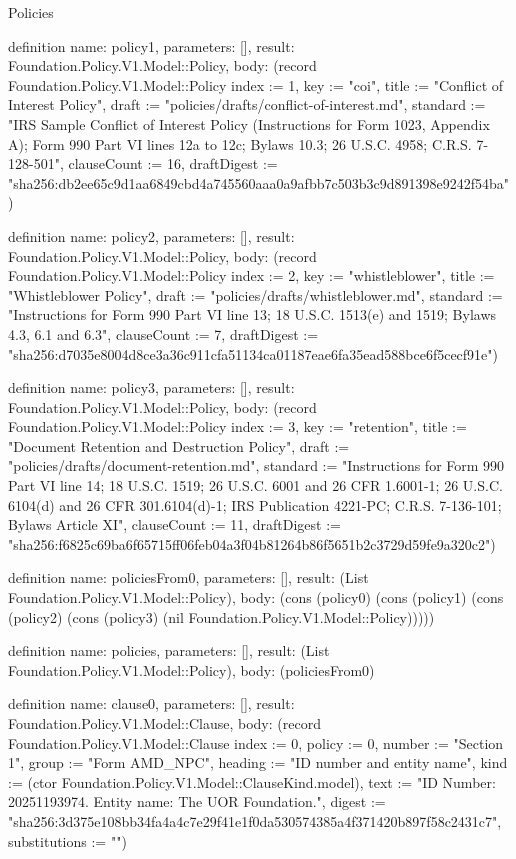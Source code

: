 \begin{lexlean}{Policies}
\begin{semanticmodule}
definition{
  name: policy1,
  parameters: [],
  result: Foundation.Policy.V1.Model::Policy,
  body: (record Foundation.Policy.V1.Model::Policy {index := 1, key := "coi", title := "Conflict of Interest Policy", draft := "policies/drafts/conflict-of-interest.md", standard := "IRS Sample Conflict of Interest Policy (Instructions for Form 1023, Appendix A); Form 990 Part VI lines 12a to 12c; Bylaws 10.3; 26 U.S.C. 4958; C.R.S. 7-128-501", clauseCount := 16, draftDigest := "sha256:db2ee65c9d1aa6849cbd4a745560aaa0a9afbb7c503b3c9d891398e9242f54ba"})
}

definition{
  name: policy2,
  parameters: [],
  result: Foundation.Policy.V1.Model::Policy,
  body: (record Foundation.Policy.V1.Model::Policy {index := 2, key := "whistleblower", title := "Whistleblower Policy", draft := "policies/drafts/whistleblower.md", standard := "Instructions for Form 990 Part VI line 13; 18 U.S.C. 1513(e) and 1519; Bylaws 4.3, 6.1 and 6.3", clauseCount := 7, draftDigest := "sha256:d7035e8004d8ce3a36c911cfa51134ca01187eae6fa35ead588bce6f5cecf91e"})
}

definition{
  name: policy3,
  parameters: [],
  result: Foundation.Policy.V1.Model::Policy,
  body: (record Foundation.Policy.V1.Model::Policy {index := 3, key := "retention", title := "Document Retention and Destruction Policy", draft := "policies/drafts/document-retention.md", standard := "Instructions for Form 990 Part VI line 14; 18 U.S.C. 1519; 26 U.S.C. 6001 and 26 CFR 1.6001-1; 26 U.S.C. 6104(d) and 26 CFR 301.6104(d)-1; IRS Publication 4221-PC; C.R.S. 7-136-101; Bylaws Article XI", clauseCount := 11, draftDigest := "sha256:f6825c69ba6f65715ff06feb04a3f04b81264b86f5651b2c3729d59fe9a320c2"})
}

definition{
  name: policiesFrom0,
  parameters: [],
  result: (List Foundation.Policy.V1.Model::Policy),
  body: (cons (policy0) (cons (policy1) (cons (policy2) (cons (policy3) (nil Foundation.Policy.V1.Model::Policy)))))
}

definition{
  name: policies,
  parameters: [],
  result: (List Foundation.Policy.V1.Model::Policy),
  body: (policiesFrom0)
}

definition{
  name: clause0,
  parameters: [],
  result: Foundation.Policy.V1.Model::Clause,
  body: (record Foundation.Policy.V1.Model::Clause {index := 0, policy := 0, number := "Section 1", group := "Form AMD_NPC", heading := "ID number and entity name", kind := (ctor Foundation.Policy.V1.Model::ClauseKind.model), text := "ID Number: 20251193974. Entity name: The UOR Foundation.", digest := "sha256:3d375e108bb34fa4a4c7e29f41e1f0da530574385a4f371420b897f58c2431c7", substitutions := ""})
}


\end{semanticmodule}
\end{lexlean}
